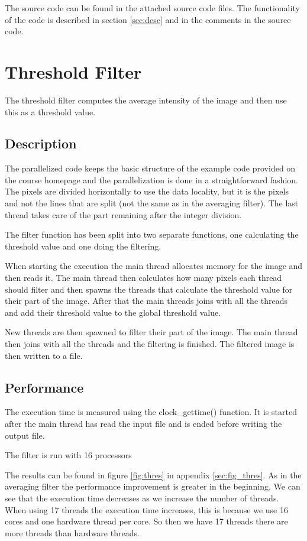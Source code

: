 \documentclass[a4paper, 12pt]{article}
\begin{document}
The source code can be found in the attached source code files.
The functionality of the code is described in section \ref{sec:desc} and in the
comments in the source code.


\section{Threshold Filter}
The threshold filter computes the average intensity of the image and then use
this as a threshold value.


\subsection{Description}
\label{sec:desc2}
The parallelized code keeps the basic structure of the example code provided on
the course homepage and the parallelization is done in a straightforward
fashion. The pixels are divided horizontally to use the data locality, but it is
the pixels and not the lines that are split (not the same as in the averaging
filter). The last thread takes care of the part remaining after the integer
division.

The filter function has been split into two separate functions, one calculating
the threshold value and one doing the filtering.

When starting the execution the main thread allocates memory for the image and
then reads it. The main thread then calculates how many pixels each thread
should filter and then spawns the threads that calculate the threshold value for
their part of the image. After that the main threads joins with all the threads
and add their threshold value to the global threshold value.

New threads are then spawned to filter their part of the image. The main thread
then joins with all the threads and the filtering is finished. The filtered
image is then written to a file.

\subsection{Performance}

The execution time is measured using the clock\_gettime() function. It is
started after the main thread has read the input file and is ended before
writing the output file.

The filter is run with 16 processors


The results can be found in figure \ref{fig:thres} in appendix
\ref{sec:fig_thres}. As in the averaging filter the performance improvement is
greater in the beginning. We can see that the execution time decreases as we
increase the number of threads. When using 17 threads the execution time
increases, this is because we use 16 cores and one hardware thread per core. So
then we have 17 threads there are more threads than hardware threads.
\end{document}
